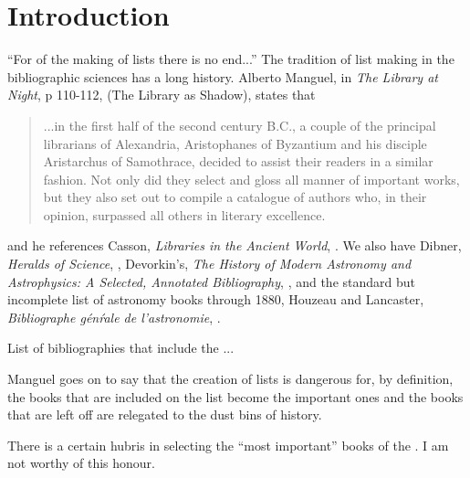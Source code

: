 \chapter{Introduction}

``For of the making of lists there is no end...'' The
tradition of list making in the bibliographic sciences has
a long history.
Alberto Manguel, in \emph{The Library at Night}, p 110-112, (The Library
as Shadow), states that
\begin{quote}
...in the first half of the second century B.C., a couple of the
principal librarians of Alexandria, Aristophanes of Byzantium and his
disciple Aristarchus of Samothrace, decided to assist their readers in a similar fashion.
Not only did they select and gloss all manner of important works, but they also set out
to compile a catalogue of authors who, in their opinion, surpassed all others in 
literary excellence. \cite{manguel:2008}
\end{quote}
and he references Casson, \emph{Libraries in the Ancient World}, \cite{casson:2001}.
We also have Dibner, \emph{Heralds of Science}, \cite{dibner:1955},
Devorkin's, \emph{The History of Modern Astronomy and Astrophysics: A Selected,
Annotated Bibliography}, \cite{devorkin:1982},
and the standard but incomplete list of astronomy books through 1880, Houzeau and Lancaster,
\emph{Bibliographe g\'{e}n\'{r}ale de l'astronomie}, \cite{houzeau:1882}.

List of bibliographies that include the ...

Manguel goes on to say that the creation of lists is dangerous
for, by definition, the books that are included on the list
become the important ones and the books that are left off
are relegated to the dust bins of history.

There is a certain hubris in selecting the ``most important'' books
of the . I am not worthy of this honour.

